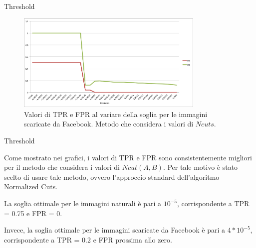 \begin{tframe}{Threshold}

\begin{figure}[h]
\begin{center}
\includegraphics[width=0.8\textwidth]{../images/soglia_imgnat_fb_NC.png}
\end{center}
  \caption{Valori di TPR e FPR al variare della soglia per le immagini scaricate da Facebook. Metodo che considera i valori di $Ncuts$.}
\label{fig:soglia AC}
\end{figure}

\end{tframe}

\begin{tframe}{Threshold}

Come mostrato nei grafici, i valori di TPR e FPR sono consistentemente migliori per il metodo che considera i valori di $Ncut(A, B)$. Per tale motivo è stato scelto di usare tale metodo, ovvero l'approccio standard dell'algoritmo Normalized Cuts.

\vspace{0.1in}

La soglia ottimale per le immagini naturali è pari a $10^{-5}$, corrispondente a TPR = 0.75 e FPR = 0.

\vspace{0.1in}

Invece, la soglia ottimale per le immagini scaricate da Facebook è pari a $4*10^{-5}$, corrispondente a TPR = 0.2 e FPR prossima allo zero.

\end{tframe}



